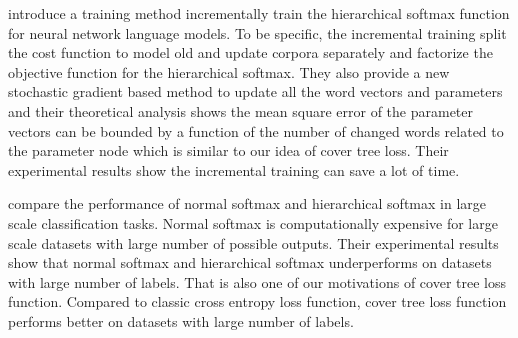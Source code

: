 \documentclass[10pt]{article}
\theoremstyle{definition}
\DeclareMathOperator{\E}{\mathbb E}
\DeclareMathOperator*{\argmin}{arg\,min}
\newcommand{\loss}{\ell}
\newcommand{\x}{\mathbf x}
\newcommand{\lF}[1]{{\lVert {#1} \rVert}_F}
\begin{document}
\cite{Peng2017IncrementallyLT} introduce a training method incrementally train the hierarchical softmax function for neural network language models. 
To be specific, the incremental training split the cost function to model old and update corpora separately and factorize the objective function for the hierarchical softmax. 
They also provide a new stochastic gradient based method to update all the word vectors and parameters and their theoretical analysis shows the mean square error of the parameter vectors can be bounded by a function of the number of changed words related to the parameter node which is similar to our idea of cover tree loss.
Their experimental results show the incremental training can save a lot of time.

\cite{Mohammed2018EffectivenessOH} compare the performance of normal softmax and hierarchical softmax in large scale classification tasks. 
Normal softmax is computationally expensive for large scale datasets with large number of possible outputs.
Their experimental results show that normal softmax and hierarchical softmax underperforms on datasets with large number of labels.
That is also one of our motivations of cover tree loss function. 
Compared to classic cross entropy loss function, cover tree loss function performs better on datasets with large number of labels.



%
\end{document}
